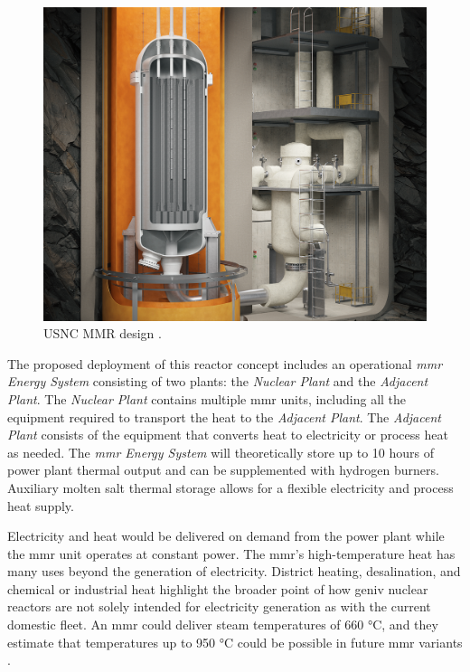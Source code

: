 \begin{figure}[H]
    \centering
    \includegraphics[scale=0.19]{images/reactor_design/wide-02.png}
    \caption{USNC MMR design \cite{usnc_design_2021}.}
    \label{fig:mmr_design}
\end{figure}

The proposed deployment of this reactor concept includes an operational \textit{\gls{mmr} Energy System} consisting of two plants: the \textit{Nuclear Plant} and the \textit{Adjacent Plant}. The \textit{Nuclear Plant} contains multiple \gls{mmr} units, including all the equipment required to transport the heat to the \textit{Adjacent Plant}. The \textit{Adjacent Plant} consists of the equipment that converts heat to electricity or process heat as needed. The \textit{\gls{mmr} Energy System} will theoretically store up to 10 hours of power plant thermal output and can be supplemented with hydrogen burners. Auxiliary molten salt thermal storage allows for a flexible electricity and process heat supply.

Electricity and heat would be delivered on demand from the power plant while the \gls{mmr} unit operates at constant power. The \gls{mmr}'s high-temperature heat has many uses beyond the generation of electricity. District heating, desalination, and chemical or industrial heat highlight the broader point of how \gls{geniv} nuclear reactors are not solely intended for electricity generation as with the current domestic fleet. An \gls{mmr} could deliver steam temperatures of 660 °C, and they estimate that temperatures up to 950 °C could be possible in future \gls{mmr} variants \cite{usnc_design_2021}.

